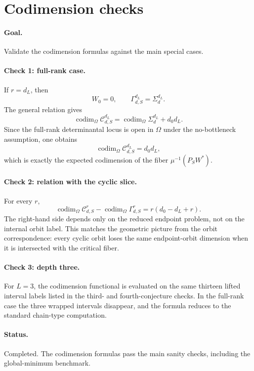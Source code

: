 \section*{Codimension checks}

\paragraph{Goal.}
Validate the codimension formulas against the main special cases.

\paragraph{Check 1: full-rank case.}
If \(r=d_L\), then
\[
W_0=0,
\qquad
\Gamma_{d,S}^{d_L}=\Sigma_d^{d_L}.
\]
The general relation gives
\[
\operatorname{codim}_{\Omega}\mathcal C_{d,S}^{d_L}
=
\operatorname{codim}_{\Omega}\Sigma_d^{d_L}+d_0d_L.
\]
Since the full-rank determinantal locus is open in \(\Omega\) under the
no-bottleneck assumption, one obtains
\[
\operatorname{codim}_{\Omega}\mathcal C_{d,S}^{d_L}=d_0d_L,
\]
which is exactly the expected codimension of the fiber
\(\mu^{-1}(P_SW^\ast)\).

\paragraph{Check 2: relation with the cyclic slice.}
For every \(r\),
\[
\operatorname{codim}_{\Omega}\mathcal C_{d,S}^r
-\operatorname{codim}_{\Omega}\Gamma_{d,S}^r
=
r(d_0-d_L+r).
\]
The right-hand side depends only on the reduced endpoint problem, not on the
internal orbit label. This matches the geometric picture from the orbit
correspondence: every cyclic orbit loses the same endpoint-orbit dimension when
it is intersected with the critical fiber.

\paragraph{Check 3: depth three.}
For \(L=3\), the codimension functional is evaluated on the same thirteen lifted
interval labels listed in the third- and fourth-conjecture checks. In the
full-rank case the three wrapped intervals disappear, and the formula reduces to
the standard chain-type computation.

\paragraph{Status.}
Completed. The codimension formulas pass the main sanity checks, including the
global-minimum benchmark.
